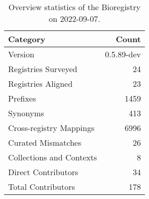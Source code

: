 \begin{table}
\centering
\caption{Overview statistics of the Bioregistry on 2022-09-07.}
\label{tab:bioregistry-summary}
\begin{tabular}{lr}
\toprule
                Category &      Count \\
\midrule
                 Version & 0.5.89-dev \\
     Registries Surveyed &         24 \\
      Registries Aligned &         23 \\
                Prefixes &       1459 \\
                Synonyms &        413 \\
 Cross-registry Mappings &       6996 \\
      Curated Mismatches &         26 \\
Collections and Contexts &          8 \\
     Direct Contributors &         34 \\
      Total Contributors &        178 \\
\bottomrule
\end{tabular}
\end{table}
